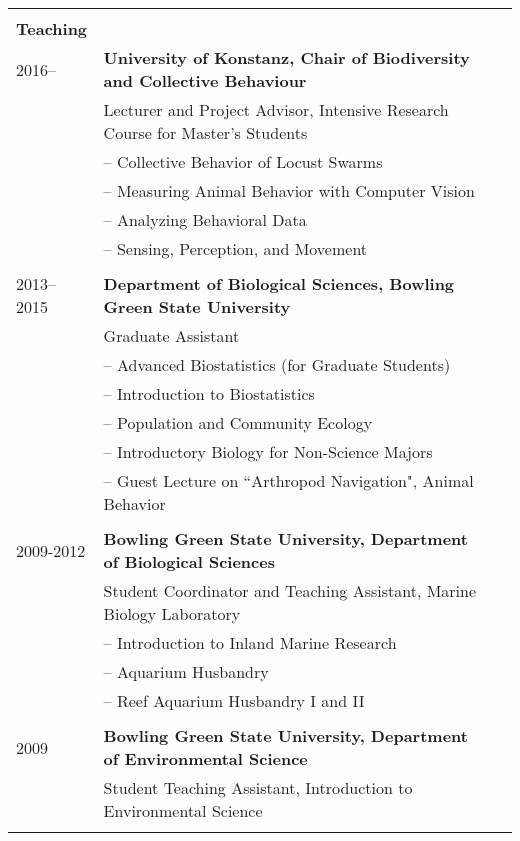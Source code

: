 \documentclass[letterpaper,7pt,oneside]{article}
\begin{document}
\begin{small}
\begin{longtable}{@{} l p{5.3in}l}
     & \\
\Large{\textbf{Teaching}}  \vspace{5mm} \\
 \large{2016–}
    & \textbf{University of Konstanz, Chair of Biodiversity and Collective Behaviour} \\
     & Lecturer and Project Advisor, Intensive Research Course for Master's Students \\
   	 & – Collective Behavior of Locust Swarms \\
     & – Measuring Animal Behavior with Computer Vision \\
     & – Analyzing Behavioral Data \\
     & – Sensing, Perception, and Movement \\
     & \\
 \large{2013–2015}
 & \textbf{Department of Biological Sciences, Bowling Green State University} \\
 & Graduate Assistant \\
 & – Advanced Biostatistics (for Graduate Students)\\
 & – Introduction to Biostatistics \\
 & – Population and Community Ecology \\
 & – Introductory Biology for Non-Science Majors \\
 & – Guest Lecture on ``Arthropod Navigation", Animal Behavior \\
 & \\
 \large{2009-2012}
 & \textbf{Bowling Green State University, Department of Biological Sciences} \\
 & Student Coordinator and Teaching Assistant, Marine Biology Laboratory \\
 & – Introduction to Inland Marine Research \\
 & – Aquarium Husbandry \\
 & – Reef Aquarium Husbandry I and II \\
 & \\
 \large{2009}
 & \textbf{Bowling Green State University, Department of Environmental Science} \\
 & Student Teaching Assistant, Introduction to Environmental Science \\
 & \\
 

\end{longtable}
\end{small}
\end{document}
